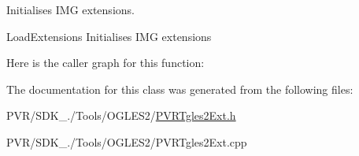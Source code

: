 Initialises I\+M\+G extensions. 







  Load\+Extensions  Initialises I\+M\+G extensions 

Here is the caller graph for this function\+:




The documentation for this class was generated from the following files\+:\begin{DoxyCompactItemize}
\item 
P\+V\+R/\+S\+D\+K\+\_./\+Tools/\+O\+G\+L\+E\+S2/\hyperlink{_p_v_r_tgles2_ext_8h}{P\+V\+R\+Tgles2\+Ext.\+h}\item 
P\+V\+R/\+S\+D\+K\+\_./\+Tools/\+O\+G\+L\+E\+S2/P\+V\+R\+Tgles2\+Ext.\+cpp\end{DoxyCompactItemize}
